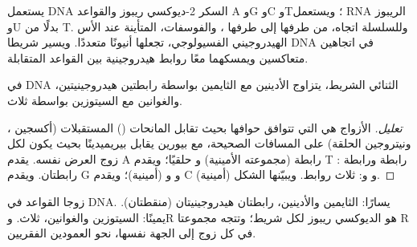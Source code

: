 يستعمل DNA السكر 2-ديوكسي ريبوز والقواعد A وG وC وT؛ ويستعمل RNA الريبوز وU بدلًا من T. وللسلسلة
اتجاه، من طرفها  إلى طرفها ، والفوسفات، المتأينة عند الأس الهيدروجيني الفسيولوجي، تجعلها
أنيونًا متعددًا. ويسير شريطا DNA في اتجاهين متعاكسين ويمسكهما معًا روابط هيدروجينية بين
القواعد المتقابلة.

\begin{proposition}\label{prop:b2:biomolecules:pairing}
في DNA الثنائي الشريط، يتزاوج الأدينين مع الثايمين بواسطة رابطتين هيدروجينيتين، والغوانين مع السيتوزين
بواسطة ثلاث.
\end{proposition}

\begin{proof}[تعليل]
الأزواج هي التي تتوافق حوافها بحيث تقابل المانحات () المستقبلات (أكسجين ، ونيتروجين
الحلقة) على المسافات الصحيحة، مع بيورين يقابل بيريميدينًا بحيث يكون لكل زوج العرض
نفسه. يقدم A رابطة  (مجموعته الأمينية) و حلقيًا؛ ويقدم T رابطة  ورابطة : رابطتان. ويقدم G
 و و (أمينية)؛ ويقدم C  (أمينية) و و: ثلاث
روابط. ويبيّنها الشكل.
\end{proof}

\begin{omfigure}
\par\vspace{6pt}

{\small زوجا القواعد في DNA. يسارًا: الثايمين والأدينين، رابطتان هيدروجينيتان (منقطتان). يمينًا:
السيتوزين والغوانين، ثلاث. وR هو الديوكسي ريبوز لكل شريط؛ وتتجه مجموعتا R في كل زوج إلى
الجهة نفسها، نحو العمودين الفقريين.}
\end{omfigure}

